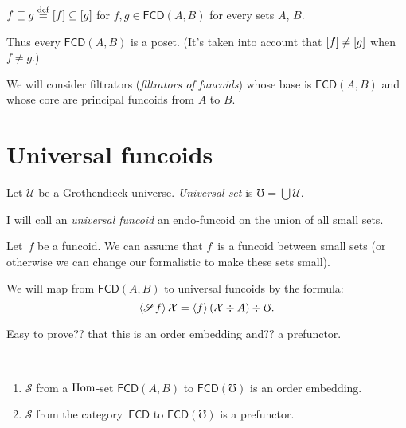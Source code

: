 \begin{defn}
$f\sqsubseteq g\overset{\mathrm{def}}{=}\mathord{\mathrel{\left[f\right]}}\subseteq\mathord{\mathrel{\left[g\right]}}$ for $f,g\in\mathsf{FCD}(A,B)$
for every sets $A$, $B$.
\end{defn}
Thus every $\mathsf{FCD}(A,B)$ is a poset. (It's taken into account
that $\mathord{\mathrel{\left[f\right]}}\ne\mathord{\mathrel{\left[g\right]}}$ when $f\ne g$.)

We will consider filtrators (\emph{filtrators
of funcoids}) whose base is $\mathsf{FCD}(A,B)$ and whose core are
principal funcoids from $A$ to $B$.

\section{Universal funcoids}

\begin{defn}
Let $\mathscr{U}$ be a Grothendieck universe.
\emph{Universal set} is $\mho = \bigcup\mathscr{U}$.
\end{defn}

\begin{defn}
I will call an \emph{universal funcoid} an endo-funcoid on the union of all small sets.
\end{defn}

Let~$f$ be a funcoid. We can assume that $f$~is a funcoid between small sets
(or otherwise we can change our formalistic to make these sets small).

We will map from $\mathsf{FCD}(A,B)$ to universal funcoids by the formula:
\[ \left\langle \mathscr{S}f\right\rangle\mathcal{X} = \left\langle f\right\rangle(\mathcal{X}\div A)\div\mho. \]

Easy to prove?? that this is an order embedding and?? a prefunctor.

\begin{prop}
~
\begin{enumerate}
\item $\mathscr{S}$ from a $\operatorname{Hom}$-set $\mathsf{FCD}(A,B)$
to $\mathsf{FCD}(\mho)$ is an order embedding.
\item $\mathscr{S}$ from the category~$\mathsf{FCD}$
to $\mathsf{FCD}(\mho)$ is a prefunctor.
\end{enumerate}
\end{prop}

